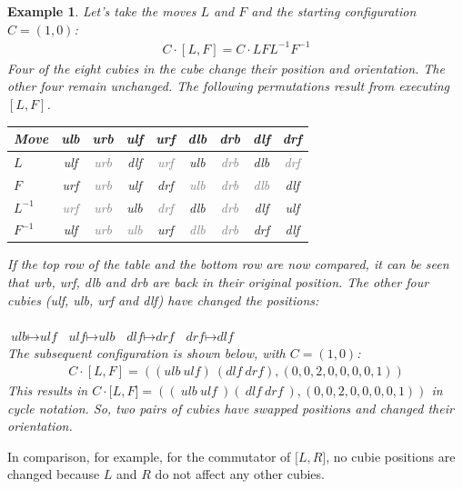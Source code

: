 \documentclass[12pt,a4paper]{article}
\theoremstyle{custom}
\newtheorem*{example}{Example}
\begin{document}
\begin{example}
Let's take the moves $L$ and $F$ and the starting configuration $C = (1,0)$:
\begin{align*}
C \cdot [L, F] = C \cdot LFL^{-1}F^{-1}
\end{align*}
Four of the eight cubies in the cube change their position and orientation. The other four remain unchanged.
The following permutations result from executing $[L, F]$.
\begin{center}
\begin{tabular}{lcccccccc}
\toprule
\textbf{Move} & \textbf{ulb} & \textbf{urb} & \textbf{ulf} & \textbf{urf} & \textbf{dlb} & \textbf{drb} & \textbf{dlf} & \textbf{drf} \\
\midrule
$L$ & ulf & \textcolor{gray}{urb} & dlf & \textcolor{gray}{urf} & ulb & \textcolor{gray}{drb} & dlb & \textcolor{gray}{drf} \\
$F$ & urf & \textcolor{gray}{urb} & ulf & drf & \textcolor{gray}{ulb} & \textcolor{gray}{drb} & \textcolor{gray}{dlb} & dlf \\
$L^{-1}$ & \textcolor{gray}{urf} & \textcolor{gray}{urb} & ulb & \textcolor{gray}{drf} & dlb & \textcolor{gray}{drb} & dlf & ulf \\
$F^{-1}$ & ulf & \textcolor{gray}{urb} & \textcolor{gray}{ulb} & urf & \textcolor{gray}{dlb} & \textcolor{gray}{drb} & drf & dlf \\
\bottomrule
\end{tabular}
\end{center}


If the top row of the table and the bottom row are now compared, it can be seen that \textit{urb}, \textit{urf}, \textit{dlb} and \textit{drb} are back in their original position. The other four cubies (\textit{ulf}, \textit{ulb}, \textit{urf} and \textit{dlf}) have changed the positions: \\
\\
\hspace*{1.5cm } $\textit{ulb} \mapsto \textit{ulf}$ \hspace*{1.5cm }$\textit{ulf} \mapsto \textit{ulb}$ \hspace*{1.5cm } $\textit{dlf} \mapsto \textit{drf}$ \hspace*{1.5cm } $\textit{drf} \mapsto \textit{dlf}$
\\
The subsequent configuration is shown below, with $C=(1,0)$:
\begin{align*}
C \cdot [L, F] = (( \textit{ulb} \ \textit{ulf} ) \ (\textit{dlf} \ \textit{drf} ), (0,0,2,0,0,0 ,0,1) )
\end{align*}
This results in $C \cdot \lbrack L, F \rbrack = (( \ \textit{ulb} \ \textit{ulf} \ )(\ \textit{dlf} \ \textit{drf} \ ), (0 ,0,2,0,0,0,0,1) )$ in cycle notation.
So,  two pairs of cubies have swapped positions and changed their orientation. 
\end{example}
In comparison, for example, for the commutator of $\lbrack L, R \rbrack$, no cubie positions are changed because $L$ and $R$ do not affect any other cubies.
\end{document}
